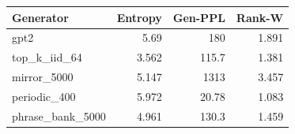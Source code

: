 \begin{tabular}{lrrr}
\toprule
Generator & Entropy & Gen-PPL & Rank-W \\
\midrule
gpt2 & 5.69 & 180 & 1.891 \\
top\_k\_iid\_64 & 3.562 & 115.7 & 1.381 \\
mirror\_5000 & 5.147 & 1313 & 3.457 \\
periodic\_400 & 5.972 & 20.78 & 1.083 \\
phrase\_bank\_5000 & 4.961 & 130.3 & 1.459 \\
\bottomrule
\end{tabular}
